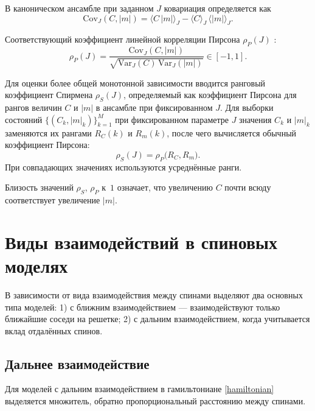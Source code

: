 В каноническом ансамбле при заданном $J$ ковариация определяется как
\begin{equation}
	\mathrm{Cov}_J(C,|m|)
	= \langle C\,|m|\rangle_J - \langle C\rangle_J\,\langle |m|\rangle_J.
	\label{eq:cov_def}
\end{equation} 

Соответствующий коэффициент линейной  корреляции Пирсона  $\rho_P(J)$  :
\begin{equation}
	\rho_P(J)
	= \frac{\mathrm{Cov}_J(C,|m|)}
	{\sqrt{\mathrm{Var}_J(C)\,\mathrm{Var}_J(|m|)}}
	\in [-1,1].
	\label{eq:pearson}
\end{equation} 

Для оценки более общей монотонной
зависимости вводится ранговый коэффициент Спирмена $\rho_S(J)$,
определяемый как коэффициент Пирсона для рангов величин $C$ и $|m|$
в ансамбле при фиксированном $J$.   Для выборки состояний
$\{(C_k,|m|_k)\}_{k=1}^{M}$ при фиксированном параметре $J$ значения $C_k$ и
$|m|_k$ заменяются их рангами $R_C(k)$ и $R_m(k)$, после чего
вычисляется обычный коэффициент Пирсона:
\begin{equation}
	\rho_S(J)
	=
	\rho_P\bigl(R_C,R_m\bigr).
	\label{eq:spearman}
\end{equation}
При совпадающих значениях используются усреднённые ранги. 



 Близость значений $\rho_S$,  $\rho_P$  к~$1$ означает, что увеличению $C$ почти всюду соответствует увеличение $|m|$.   

 \section{ Виды взаимодействий в спиновых моделях }\label{sec:3_ch:1}

В зависимости от вида взаимодействия между спинами выделяют два основных типа моделей:  1) с ближним взаимодействием --- взаимодействуют только ближайшие соседи на решетке;  2) с дальним взаимодействием, когда учитывается вклад отдалённых спинов. 


 
\subsection{  Дальнее взаимодействие  }\label{sub2:sec:2_ch:1} 
 
  
 Для моделей с дальним взаимодействием в гамильтониане \eqref{hamiltonian}  выделяется множитель, обратно пропорциональный расстоянию между спинами. 
 

